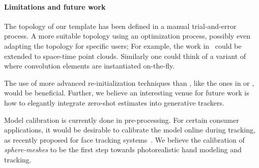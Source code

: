 \paragraph{Limitations and future work} 
The topology of our template has been defined in a manual trial-and-error process. A more suitable topology  using an optimization process, possibly even adapting the topology for specific users; For example, the work in~\cite{thiery2016spheremesh} could be extended to space-time point clouds. Similarly one could think of a variant of~\cite{newcombe2015dynfusion} where convolution elements are instantiated on-the-fly.
% 
\begin{draft}
The use of more advanced re-initialization techniques than \cite{qian2014realtime}, like the ones in \cite{krupka2014discriminative} or \cite{oberweger2015feedback}, would be beneficial. Further, we believe an interesting venue for future work is how to elegantly integrate zero-shot estimates into generative trackers.
\end{draft}
% 
Model calibration is currently done in pre-processing. For certain consumer applications, it would be desirable to calibrate the model online during tracking, as recently proposed for face tracking systems~\cite{bouaziz2013online}. 
% 
We believe the calibration of \emph{sphere-meshes} to be the first step towards photorealistic hand modeling and tracking. 
%


